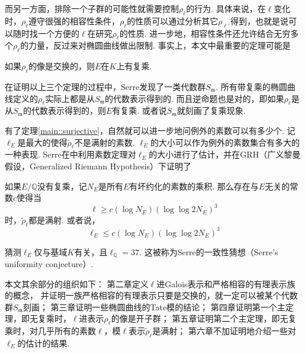 而另一方面，排除一个子群的可能性就需要控制$\rho_{\ell}$的行为. 具体来说，在$\ell$变化时，$\rho_{\ell}$遵守很强的相容性条件，$\rho_{\ell}$的性质可以通过分析其它$\rho_{\ell'}$得到，也就是说可以随时找一个方便的$\ell$在研究$\rho_{\ell}$的性质. 进一步地，相容性条件还允许结合无穷多个$\rho_{\ell}$的力量，反过来对椭圆曲线做出限制. 事实上，本文中最重要的定理可能是

\begin{cthm}
    如果$\rho_{\ell}$的像是交换的，则$E$在$K$上有复乘.
\end{cthm}

在证明以上三个定理的过程中，Serre发现了一类代数群$S_{\mathfrak{m}}$. 所有带复乘的椭圆曲线定义的$\rho_{\ell}$实际上都是从$S_{\mathfrak{m}}$的代数表示得到的. 而且逆命题也是对的，即如果$\rho_{\ell}$是从$S_{\mathfrak{m}}$的代数表示得到的，则$E$有复乘. 或者说$S_{\mathfrak{m}}$就刻画了复乘现象.

有了定理\ref{main::surjective}，自然就可以进一步地问例外的素数可以有多少个.
记$\ell_{E}$是最大的使得$\tilde{\rho}_{\ell}$不是满射的素数.
$\ell_{E}$的大小可以作为例外的素数集合有多大的一种表现.
Serre在\parencite{serre1981quelques}中利用素数定理对$\ell_{E}$的大小进行了估计，并在GRH（广义黎曼假设，Generalized Riemann Hypothesis）下证明了
\begin{cthm}
    如果$E/\mathbb{Q}$没有复乘，记$N_E$是所有$E$有坏约化的素数的乘积. 那么存在与$E$无关的常数$c$使得当
    \begin{equation}
        \ell \geq c(\log N_E)(\log\log 2N_E)^3
    \end{equation}
    时，$\tilde{\rho}_{\ell}$都是满射. 或者说，
    \begin{equation}
        \ell_{E} \leq c(\log N_E)(\log \log 2N_E)^3
    \end{equation}
\end{cthm}

猜测$\ell_{E}$仅与基域$K$有关，且$\ell_{\mathbb{Q}}=37$.
这被称为Serre的一致性猜想（Serre's uniformity conjecture）.

本文其余部分的组织如下：
第二章定义$\ell$进Galois表示和严格相容的有理表示族的概念，
并证明一族严格相容的有理表示只要是交换的，就一定可以被某个代数群$S_{\mathfrak{m}}$刻画；
第三章证明一些椭圆曲线的Tate模的结论；
第四章证明第一个主定理，即无复乘时，$\ell$进表示$\rho_{\ell}$的像是开子群；
第五章证明第二个主定理，即无复乘时，对几乎所有的素数$\ell$，模$\ell$表示$\tilde{\rho}_{\ell}$是满射；
第六章不加证明地介绍一些对$\ell_{E}$的估计的结果.
